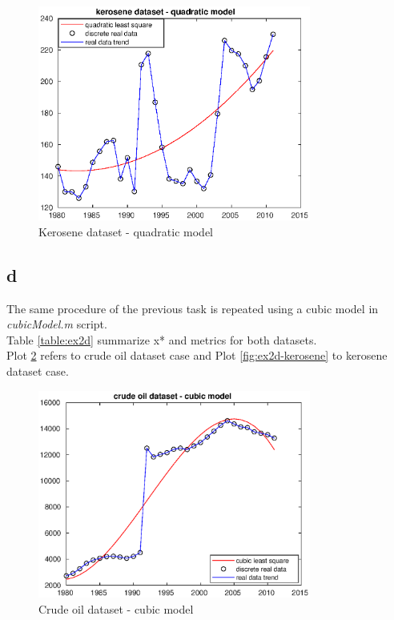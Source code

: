 \documentclass[unicode,11pt,a4paper,oneside,numbers=endperiod,openany]{scrartcl}
\begin{document}
\begin{figure}[H]
    \centering
    \caption{Kerosene dataset - quadratic model}
    \label{fig:ex2c-kerosene}
    \includegraphics[width=0.8\textwidth]{ex2c-kerosene.eps}
\end{figure}

\subsection*{d}
The same procedure of the previous task is repeated using a cubic model in \textit{cubicModel.m} script. \\
Table \ref{table:ex2d} summarize x* and metrics for both datasets. \\
Plot \ref{fig:ex2d-oil} refers to crude oil dataset case and Plot \ref{fig:ex2d-kerosene} to kerosene dataset case.

\begin{figure}[H]
    \centering
    \caption{Crude oil dataset - cubic model}
    \label{fig:ex2d-oil}
    \includegraphics[width=0.8\textwidth]{ex2d-oil.eps}
\end{figure}
\end{document}
